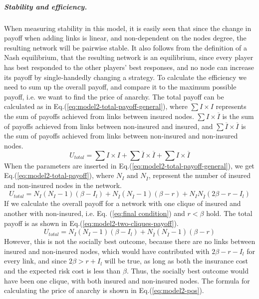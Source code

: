 \subparagraph{Stability and efficiency.}
When measuring stability in this model, it is easily seen that since the change in payoff when adding links is linear, and non-dependent on the nodes degree, the resulting network will be pairwise stable. 
It also follows from the definition of a Nash equilibrium, that the resulting network is an equilibrium, since every player has best responded to the other players' best responses, and no node can increase its payoff by single-handedly changing a strategy. 
To calculate the efficiency we need to sum up the overall payoff, and compare it to the maximum possible payoff, i.e. we want to find the price of anarchy. The total payoff can be calculated as in Eq.(\ref{eq:model2-total-payoff-general}), where $\sum I \times I$ represents the sum of payoffs achieved from links between insured nodes. $\sum I \times \overline{I}$ is the sum of payoffs achieved from links between non-insured and insured, and $\sum \overline{I} \times \overline{I}$ is the sum of payoffs achieved from links between non-insured and non-insured nodes. 
\begin{equation}
U_{total}=\sum I \times I+\sum \overline{I}\times\overline{I}+\sum I\times\overline{I}
\label{eq:model2-total-payoff-general}
\end{equation}
When the parameters are inserted in Eq.(\ref{eq:model2-total-payoff-general}), we get Eq.(\ref{eq:model2-total-payoff}), where $N_{I} \text{ and } N_{\overline{I}}$, represent the number of insured and non-insured nodes in the network.
\begin{equation}
U_{total}=N_{I}(N_{I}-1)(\beta-I_{l})+N_{\overline{I}}(N_{\overline{I}}-1)(\beta-r)+N_{I}N_{\overline{I}}(2\beta-r-I_{l})
\label{eq:model2-total-payoff}
\end{equation}
If we calculate the overall payoff for a network with one clique of insured and another with non-insured, i.e. Eq. (\ref{eq:final condition}) and $r<\beta$ hold. The total payoff is as shown in Eq.(\ref{eq:model2-two-cliques-payoff}).
\begin{equation}
U_{total}=N_{I}(N_{I}-1)(\beta-I_{l})+N_{\overline{I}}(N_{\overline{I}}-1)(\beta-r)
\label{eq:model2-two-cliques-payoff}
\end{equation}
However, this is not the socially best outcome, because there are no links between insured and non-insured nodes, which would have contributed with $2\beta-r-I_{l}$ for every link, and since $2\beta>r+I_{l}$ will be true, as long as both the insurance cost and the expected risk cost is less than $\beta$. Thus, the socially best outcome would have been one clique, with both insured and non-insured nodes. The formula for calculating the price of anarchy is shown in Eq.(\ref{eq:model2-pos}).
